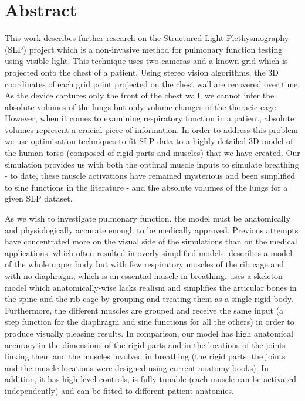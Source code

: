 \documentclass{acmsiggraph}                     %
\begin{document}
\section{Abstract}
This work describes further research on the Structured Light Plethysmography (SLP) \cite{2010slp} project which is a non-invasive method for pulmonary function testing using visible light. This technique uses two cameras and a known grid which is projected onto the chest of a patient. Using stereo vision algorithms, the 3D coordinates of each grid point projected on the chest wall are recovered over time. As the device captures only the front of the chest wall, we cannot infer the absolute volumes of the lungs but only volume changes of the thoracic cage. However, when it comes to examining respiratory function in a patient, absolute volumes represent a crucial piece of information. In order to address this problem we use optimisation techniques to fit SLP data to a highly detailed 3D model of the human torso (composed of rigid parts and muscles) that we have created. Our simulation provides us with both the optimal muscle inputs to simulate breathing - to date, these muscle activations have remained mysterious and been simplified to sine functions in the literature - and the absolute volumes of the lungs for a given SLP dataset.

As we wish to investigate pulmonary function, the model must be anatomically and physiologically accurate enough to be medically approved. Previous attempts have concentrated more on the visual side of the simulations than on the medical applications, which often resulted in overly simplified models. \cite{lee2009comprehensive} describes a model of the whole upper body but with few respiratory muscles of the rib cage and with no diaphragm, which is an essential muscle in breathing. \cite{zordan2004breathe} uses a skeleton model which anatomically-wise lacks realism and simplifies the articular bones in the spine and the rib cage by grouping and treating them as a single rigid body. Furthermore, the different muscles are grouped and receive the same input (a step function for the diaphragm and sine functions for all the others) in order to produce visually pleasing results.
In comparison, our model has high anatomical accuracy in the dimensions of the rigid parts and in the locations of the joints linking them and the muscles involved in breathing (the rigid parts, the joints and the muscle locations were designed using current anatomy books). In addition, it has high-level controls, is fully tunable (each muscle can be activated independently) and can be fitted to different patient anatomies.
\end{document}
